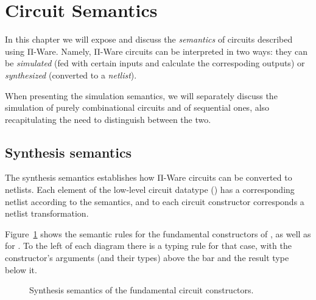     \section{Circuit Semantics}
    \label{sec:circuit-semantics}
        In this chapter we will expose and discuss the \emph{semantics} of circuits described using Π-Ware.
        Namely, Π-Ware circuits can be interpreted in two ways:
        they can be \emph{simulated} (fed with certain inputs and calculate the correspoding outputs)
        or \emph{synthesized} (converted to a \emph{netlist}).

        When presenting the simulation semantics, we will separately discuss the simulation of
        purely combinational circuits and of sequential ones,
        also recapitulating the need to distinguish between the two.

        \subsection{Synthesis semantics}
        \label{subsec:synthesis-semantics}
            The synthesis semantics establishes how Π-Ware circuits can be converted to netlists.
            Each element of the low-level circuit datatype () has a corresponding netlist
            according to the semantics,
            and to each circuit constructor corresponds a netlist transformation.

            Figure~\ref{fig:semantics-syn-fundamental} shows the semantic rules for the
            fundamental constructors of , as well as for .
            To the left of each diagram there is a typing rule for that case,
            with the constructor's arguments (and their types) above the bar and the result type below it.

            \begin{figure}[h]
                \caption{Synthesis semantics of the fundamental circuit constructors.\label{fig:semantics-syn-fundamental}}
            \end{figure}

